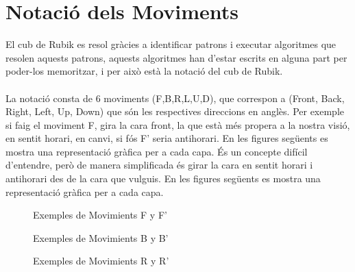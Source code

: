 \chapter{Notació dels Moviments}

El cub de Rubik es resol gràcies a identificar patrons i executar algoritmes que resolen
aquests patrons, aquests algoritmes han d'estar escrits en alguna part per poder-los memoritzar, i per això està la notació del cub de Rubik.
\\\\La notació consta de 6 moviments (F,B,R,L,U,D), que correspon a (Front, Back, Right, Left, Up, Down) que són les respectives direccions en anglès. Per exemple si faig el moviment F, gira la cara front, la que està més propera a la nostra visió, en sentit horari, en canvi, si fós F' seria antihorari. En les figures següents es mostra una representació  gràfica per a cada capa.
És un concepte difícil d'entendre, però de manera simplificada és girar la cara en sentit horari i antihorari des de la cara que vulguis. En les figures següents es mostra una representació gràfica per a cada capa.

\begin{figure}[htbp]
    \centering
    \begin{subfigure}
        \centering\RubikCubeSolvedWY
    \end{subfigure}
    \begin{subfigure}
        \centering\RubikCubeSolvedWY
    \end{subfigure}
    \caption{Exemples de Movimients F y F'}
\end{figure}

\begin{figure}[htbp]
    \centering
    \begin{subfigure}
        \centering\RubikCubeSolvedWY
    \end{subfigure}
    \begin{subfigure}
        \centering\RubikCubeSolvedWY
    \end{subfigure}
    \caption{Exemples de Movimients B y B'}
\end{figure}

\begin{figure}[htbp]
    \centering
    \begin{subfigure}
        \centering\RubikCubeSolvedWY
    \end{subfigure}
    \begin{subfigure}
        \centering\RubikCubeSolvedWY
    \end{subfigure}
    \caption{Exemples de Movimients R y R'}
\end{figure}

